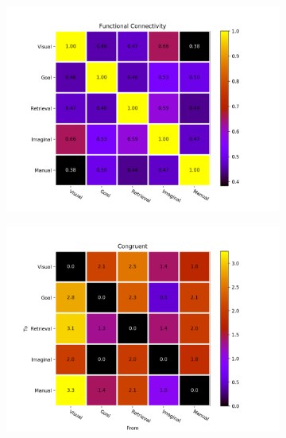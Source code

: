 \documentclass[10pt,letterpaper]{article}
\begin{document}
\begin{figure}[ht]
\centering
\begin{subfigure}{.11\textwidth}
  \centering
  \includegraphics[width=\linewidth]{func_conn.png}
  \caption{}
\end{subfigure}%
\begin{subfigure}{.11\textwidth}
  \centering
  \includegraphics[width=\linewidth]{Congruent_effect_conn.png}
  \caption{}
\end{subfigure}
\begin{subfigure}{.11\textwidth}
  \centering

\end{subfigure}
\end{figure}
\end{document}

